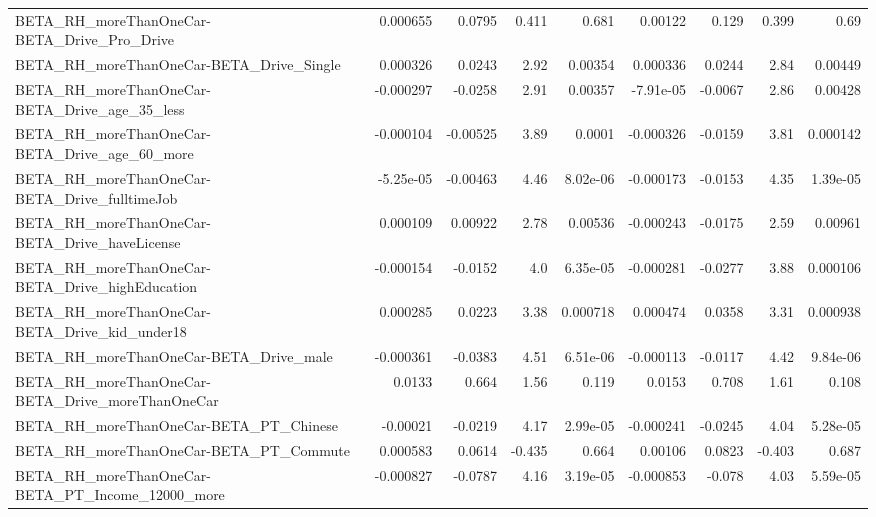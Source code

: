 \begin{tabular}{lrrrrrrrr}
BETA\_RH\_moreThanOneCar-BETA\_Drive\_Pro\_Drive        &    0.000655 &       0.0795 &     0.411 &    0.681 &    0.00122 &       0.129 &        0.399 &          0.69 \\
BETA\_RH\_moreThanOneCar-BETA\_Drive\_Single           &    0.000326 &       0.0243 &      2.92 &  0.00354 &   0.000336 &      0.0244 &         2.84 &       0.00449 \\
BETA\_RH\_moreThanOneCar-BETA\_Drive\_age\_35\_less      &   -0.000297 &      -0.0258 &      2.91 &  0.00357 &  -7.91e-05 &     -0.0067 &         2.86 &       0.00428 \\
BETA\_RH\_moreThanOneCar-BETA\_Drive\_age\_60\_more      &   -0.000104 &     -0.00525 &      3.89 &   0.0001 &  -0.000326 &     -0.0159 &         3.81 &      0.000142 \\
BETA\_RH\_moreThanOneCar-BETA\_Drive\_fulltimeJob      &   -5.25e-05 &     -0.00463 &      4.46 & 8.02e-06 &  -0.000173 &     -0.0153 &         4.35 &      1.39e-05 \\
BETA\_RH\_moreThanOneCar-BETA\_Drive\_haveLicense      &    0.000109 &      0.00922 &      2.78 &  0.00536 &  -0.000243 &     -0.0175 &         2.59 &       0.00961 \\
BETA\_RH\_moreThanOneCar-BETA\_Drive\_highEducation    &   -0.000154 &      -0.0152 &       4.0 & 6.35e-05 &  -0.000281 &     -0.0277 &         3.88 &      0.000106 \\
BETA\_RH\_moreThanOneCar-BETA\_Drive\_kid\_under18      &    0.000285 &       0.0223 &      3.38 & 0.000718 &   0.000474 &      0.0358 &         3.31 &      0.000938 \\
BETA\_RH\_moreThanOneCar-BETA\_Drive\_male             &   -0.000361 &      -0.0383 &      4.51 & 6.51e-06 &  -0.000113 &     -0.0117 &         4.42 &      9.84e-06 \\
BETA\_RH\_moreThanOneCar-BETA\_Drive\_moreThanOneCar   &      0.0133 &        0.664 &      1.56 &    0.119 &     0.0153 &       0.708 &         1.61 &         0.108 \\
BETA\_RH\_moreThanOneCar-BETA\_PT\_Chinese             &    -0.00021 &      -0.0219 &      4.17 & 2.99e-05 &  -0.000241 &     -0.0245 &         4.04 &      5.28e-05 \\
BETA\_RH\_moreThanOneCar-BETA\_PT\_Commute             &    0.000583 &       0.0614 &    -0.435 &    0.664 &    0.00106 &      0.0823 &       -0.403 &         0.687 \\
BETA\_RH\_moreThanOneCar-BETA\_PT\_Income\_12000\_more   &   -0.000827 &      -0.0787 &      4.16 & 3.19e-05 &  -0.000853 &      -0.078 &         4.03 &      5.59e-05 \\

\end{tabular}
